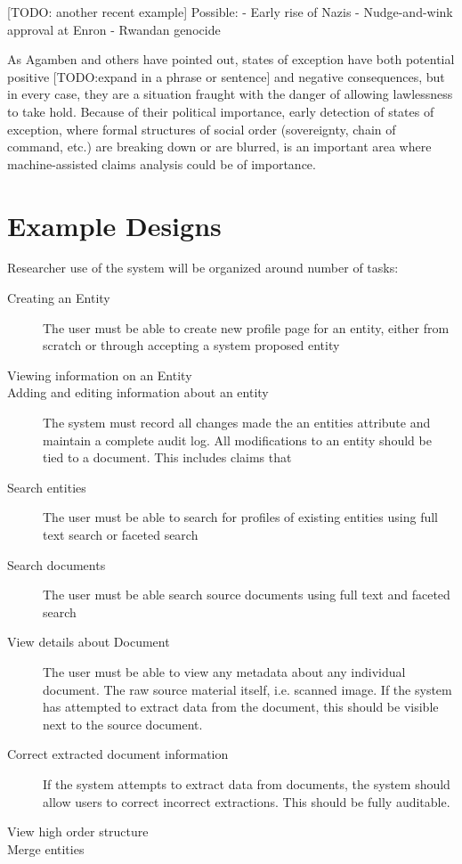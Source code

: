 \documentclass[format=siggraph, review=true]{acmart}
\begin{document}
[TODO: another recent example] Possible: 
- Early rise of Nazis
- Nudge-and-wink approval at Enron
- Rwandan genocide


As Agamben and others have pointed out, states of exception have both potential positive [TODO:expand in a phrase or sentence] and negative consequences, but in every case, they are a situation fraught with the danger of allowing lawlessness to take hold. Because of their political importance, early detection of states of exception, where formal structures of social order (sovereignty, chain of command, etc.) are breaking down or are blurred, is an important area where machine-assisted claims analysis could be of importance. 

\section{Example Designs}
Researcher use of the system will be organized around number of tasks:

\begin{description}
\item[Creating an Entity] The user must be able to create new profile
  page for an entity, either from scratch or through accepting a
  system proposed entity
\item[Viewing information on an Entity]
\item[Adding and editing information about an entity] The system must
  record all changes made the an entities attribute and maintain a
  complete audit log. All modifications to an entity should be tied to
  a document. This includes claims that 
\item[Search entities] The user must be able to search for profiles of
  existing entities using full text search or faceted search
\item[Search documents] The user must be able search source documents
  using full text and faceted search
\item[View details about Document] The user must be able to view any
  metadata about any individual document. The raw source material
  itself, i.e. scanned image. If the system has attempted
  to extract data from the document, this should be visible next to
  the source document.
\item[Correct extracted document information] If the system attempts
  to extract data from documents, the system should allow users to
  correct incorrect extractions. This should be fully auditable.
\item[View high order structure]
\item[Merge entities]
\end{description}
\end{document}
